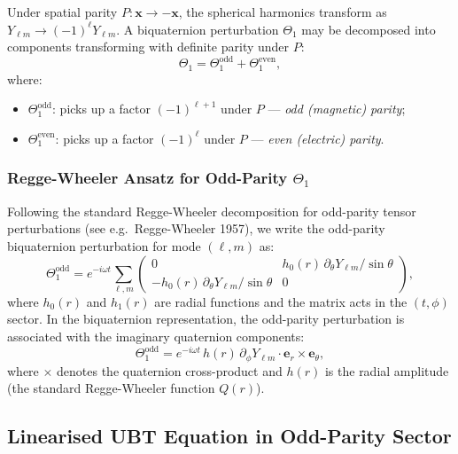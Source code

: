 \documentclass[12pt]{article}
\theoremstyle{definition}
\theoremstyle{remark}
\begin{document}
Under spatial parity $P: \mathbf{x} \to -\mathbf{x}$, the spherical
harmonics transform as $Y_{\ell m} \to (-1)^\ell Y_{\ell m}$.  A
biquaternion perturbation $\Theta_1$ may be decomposed into components
transforming with definite parity under $P$:
\begin{equation}
  \Theta_1 = \Theta_1^{\text{odd}} + \Theta_1^{\text{even}},
  \label{eq:parity_decomp}
\end{equation}
where:
\begin{itemize}
  \item $\Theta_1^{\text{odd}}$: picks up a factor $(-1)^{\ell+1}$ under
        $P$ — \emph{odd (magnetic) parity};
  \item $\Theta_1^{\text{even}}$: picks up a factor $(-1)^\ell$ under
        $P$ — \emph{even (electric) parity}.
\end{itemize}

\subsubsection{Regge-Wheeler Ansatz for Odd-Parity $\Theta_1$}

Following the standard Regge-Wheeler decomposition for odd-parity
tensor perturbations (see e.g.\ Regge-Wheeler 1957), we write the
odd-parity biquaternion perturbation for mode $(\ell, m)$ as:
\begin{equation}
  \label{eq:theta1_odd}
  \Theta_1^{\text{odd}} = e^{-i\omega t}\sum_{\ell, m}
  \begin{pmatrix}
    0 & h_0(r)\,\partial_\theta Y_{\ell m}/\sin\theta \\
    -h_0(r)\,\partial_\theta Y_{\ell m}/\sin\theta & 0
  \end{pmatrix},
\end{equation}
where $h_0(r)$ and $h_1(r)$ are radial functions and the matrix
acts in the $(t,\phi)$ sector.  In the biquaternion representation,
the odd-parity perturbation is associated with the imaginary
quaternion components:
\begin{equation}
  \Theta_1^{\text{odd}} = e^{-i\omega t}\,
    h(r)\,\partial_\phi Y_{\ell m} \cdot \boldsymbol{e}_r \times \boldsymbol{e}_\theta,
  \label{eq:theta1_odd_biquat}
\end{equation}
where $\times$ denotes the quaternion cross-product and $h(r)$ is the
radial amplitude (the standard Regge-Wheeler function $Q(r)$).

\subsection{Linearised UBT Equation in Odd-Parity Sector}
\end{document}

